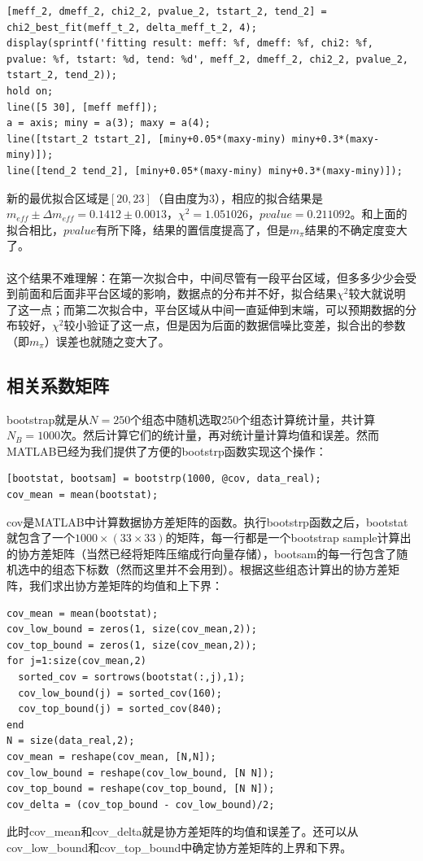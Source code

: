 \documentclass[paper=a4, fontsize=11pt]{scrartcl} %
\numberwithin{equation}{section} %
\numberwithin{figure}{section} %
\numberwithin{table}{section} %
\begin{document}
\begin{CJK*}{UTF8}{gbsn}
\begin{lstlisting}
[meff_2, dmeff_2, chi2_2, pvalue_2, tstart_2, tend_2] = chi2_best_fit(meff_t_2, delta_meff_t_2, 4);
display(sprintf('fitting result: meff: %f, dmeff: %f, chi2: %f, pvalue: %f, tstart: %d, tend: %d', meff_2, dmeff_2, chi2_2, pvalue_2, tstart_2, tend_2));
hold on;
line([5 30], [meff meff]);
a = axis; miny = a(3); maxy = a(4);
line([tstart_2 tstart_2], [miny+0.05*(maxy-miny) miny+0.3*(maxy-miny)]);
line([tend_2 tend_2], [miny+0.05*(maxy-miny) miny+0.3*(maxy-miny)]);
\end{lstlisting}
新的最优拟合区域是$[20,23]$（自由度为3），相应的拟合结果是$m_{eff}\pm \Delta m_{eff}=0.1412\pm0.0013$，$\chi^2=1.051026$，$pvalue=0.211092$。和上面的拟合相比，$pvalue$有所下降，结果的置信度提高了，但是$m_\pi$结果的不确定度变大了。
\\\\
这个结果不难理解：在第一次拟合中，中间尽管有一段平台区域，但多多少少会受到前面和后面非平台区域的影响，数据点的分布并不好，拟合结果$\chi^2$较大就说明了这一点；而第二次拟合中，平台区域从中间一直延伸到末端，可以预期数据的分布较好，$\chi^2$较小验证了这一点，但是因为后面的数据信噪比变差，拟合出的参数（即$m_\pi$）误差也就随之变大了。

\subsection{相关系数矩阵}
bootstrap就是从$N=250$个组态中随机选取250个组态计算统计量，共计算$N_B=1000$次。然后计算它们的统计量，再对统计量计算均值和误差。然而MATLAB已经为我们提供了方便的bootstrp函数实现这个操作：
\lstset{language=MATLAB}
\begin{lstlisting}
[bootstat, bootsam] = bootstrp(1000, @cov, data_real);
cov_mean = mean(bootstat);
\end{lstlisting}
cov是MATLAB中计算数据协方差矩阵的函数。执行bootstrp函数之后，bootstat就包含了一个$1000\times (33\times33)$的矩阵，每一行都是一个bootstrap sample计算出的协方差矩阵（当然已经将矩阵压缩成行向量存储），bootsam的每一行包含了随机选中的组态下标数（然而这里并不会用到）。根据这些组态计算出的协方差矩阵，我们求出协方差矩阵的均值和上下界：
\begin{lstlisting}
cov_mean = mean(bootstat);
cov_low_bound = zeros(1, size(cov_mean,2));
cov_top_bound = zeros(1, size(cov_mean,2));
for j=1:size(cov_mean,2)
  sorted_cov = sortrows(bootstat(:,j),1);
  cov_low_bound(j) = sorted_cov(160);
  cov_top_bound(j) = sorted_cov(840);
end
N = size(data_real,2);
cov_mean = reshape(cov_mean, [N,N]);
cov_low_bound = reshape(cov_low_bound, [N N]);
cov_top_bound = reshape(cov_top_bound, [N N]);
cov_delta = (cov_top_bound - cov_low_bound)/2;
\end{lstlisting}
此时cov\_mean和cov\_delta就是协方差矩阵的均值和误差了。还可以从cov\_low\_bound和cov\_top\_bound中确定协方差矩阵的上界和下界。


\end{CJK*}
\end{document}

